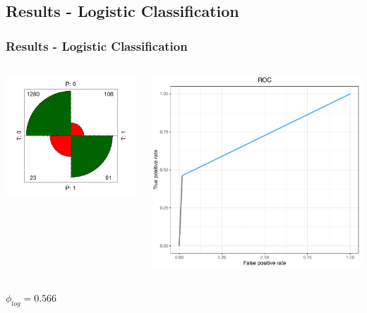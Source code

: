 \documentclass[compress]{beamer}
\begin{document}
\subsection{Results - Logistic Classification}
\begin{frame}
\frametitle{Results - Logistic Classification}
\begin{columns}
\begin{center}
\includegraphics[width=\linewidth]{Pic/LOG_FULL.png}
\end{center}
\begin{center}
\includegraphics[width=0.85\linewidth]{Pic/LOG_FULL_ROC.pdf}\\
\end{center}
\end{columns}
\begin{center}
$\phi_{log}=0.566$
\end{center}
\end{frame}
\end{document}
